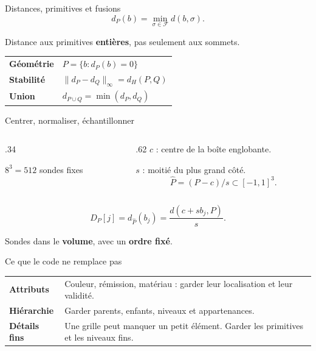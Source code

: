 \begin{frame}[t]{Distances, primitives et fusions}
\[
\boxed{d_P(b)=\min_{\sigma\in\mathcal F}d(b,\sigma).}
\]
{\small Distance aux primitives \textbf{entières}, pas seulement aux sommets.\par}
\vspace{.14cm}
\begin{tabular}{@{}p{}p{}@{}}
\textbf{Géométrie} & $P=\{b:d_P(b)=0\}$\\[.25cm]
\textbf{Stabilité} & $\|d_P-d_Q\|_\infty=d_H(P,Q)$\\[.25cm]
\textbf{Union} & $d_{P\cup Q}=\min(d_P,d_Q)$
\end{tabular}\par

\end{frame}

\begin{frame}{Centrer, normaliser, échantillonner}
\begin{columns}[c,onlytextwidth]
\begin{column}{.34\textwidth}\centering
\resizebox{!}{2.75cm}{}\par
{\small $8^3=512$ sondes fixes}
\end{column}
\begin{column}{.62\textwidth}
$c$ : centre de la boîte englobante.\par\medskip
$s$ : moitié du plus grand côté.
\[
\widehat P=(P-c)/s\subset[-1,1]^3.
\]

\end{column}
\end{columns}
\vspace{.30cm}
\[
\boxed{D_P[j]=d_{\widehat P}(b_j)
=\frac{d(c+s b_j,P)}{s}.}
\]
\begin{center}\small
Sondes dans le \textbf{volume}, avec un \textbf{ordre fixé}. 
\end{center}
\end{frame}

\begin{frame}{Ce que le code ne remplace pas}
\vspace{.16cm}
\begin{tabular}{@{}p{}p{}@{}}
\textbf{Attributs} & Couleur, rémission, matériau : garder leur localisation et leur validité.\\[.55cm]
\textbf{Hiérarchie} & Garder parents, enfants, niveaux et appartenances.\\[.55cm]
\textbf{Détails fins} & Une grille peut manquer un petit élément. Garder les primitives et les niveaux fins.
\end{tabular}


\end{frame}
